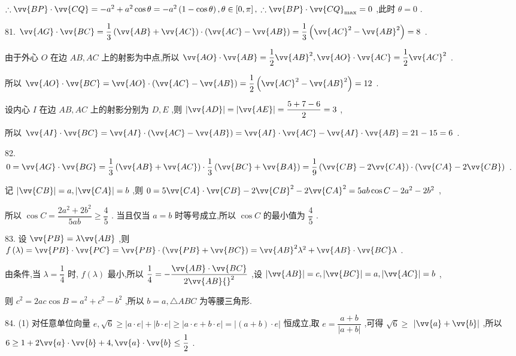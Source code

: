 $\therefore \vv{BP} \cdot  \vv{CQ} =  - {a}^{2} + {a}^{2}\cos \theta  =  - {a}^{2}\left( {1 - \cos \theta }\right) ,\theta  \in  \left\lbrack  {0,\pi }\right\rbrack  ,\;\therefore \vv{BP} \cdot  {\vv{CQ}}_{\max } = 0$ ,此时 $\theta  = 0$ .

81. $\vv{AG} \cdot  \vv{BC} = \dfrac{1}{3}\left( {\vv{AB} + \vv{AC}}\right)  \cdot  \left( {\vv{AC} - \vv{AB}}\right)  = \dfrac{1}{3}\left( {{\vv{AC}}^{2} - {\vv{AB}}^{2}}\right)  = 8$ .

由于外心 $O$ 在边 ${AB},{AC}$ 上的射影为中点,所以 $\vv{AO} \cdot  \vv{AB} = \dfrac{1}{2}{\vv{AB}}^{2},\vv{AO} \cdot  \vv{AC} = \dfrac{1}{2}{\vv{AC}}^{2}$ .

所以 $\vv{AO} \cdot  \vv{BC} = \vv{AO} \cdot  \left( {\vv{AC} - \vv{AB}}\right)  = \dfrac{1}{2}\left( {{\vv{AC}}^{2} - {\vv{AB}}^{2}}\right)  = {12}$ .

设内心 $I$ 在边 ${AB},{AC}$ 上的射影分别为 $D,E$ ,则 $\left| \vv{AD}\right|  = \left| \vv{AE}\right|  = \dfrac{5 + 7 - 6}{2} = 3$ ,

所以 $\vv{AI} \cdot  \vv{BC} = \vv{AI} \cdot  \left( {\vv{AC} - \vv{AB}}\right)  = \vv{AI} \cdot  \vv{AC} - \vv{AI} \cdot  \vv{AB} = {21} - {15} = 6$ .

82. $0 = \vv{AG} \cdot  \vv{BG} = \dfrac{1}{3}\left( {\vv{AB} + \vv{AC}}\right)  \cdot  \dfrac{1}{3}\left( {\vv{BC} + \vv{BA}}\right)  = \dfrac{1}{9}\left( {\vv{CB} - 2\vv{CA}}\right)  \cdot  \left( {\vv{CA} - 2\vv{CB}}\right)$ .

记 $\left| \vv{CB}\right|  = a,\left| \vv{CA}\right|  = b$ ,则 $0 = 5\vv{CA} \cdot  \vv{CB} - 2{\vv{CB}}^{2} - 2{\vv{CA}}^{2} = {5ab}\cos C - 2{a}^{2} - 2{b}^{2}$ ,

所以 $\cos C = \dfrac{2{a}^{2} + 2{b}^{2}}{5ab} \geq  \dfrac{4}{5}$ . 当且仅当 $a = b$ 时等号成立,所以 $\cos C$ 的最小值为 $\dfrac{4}{5}$ .

83. 设 $\vv{PB} = \lambda \vv{AB}$ ,则 $f\left( \lambda \right)  = \vv{PB} \cdot  \vv{PC} = \vv{PB} \cdot  \left( {\vv{PB} + \vv{BC}}\right)  = {\vv{AB}}^{2}{\lambda }^{2} + \vv{AB} \cdot  \vv{BC}\lambda$ .

由条件,当 $\lambda  = \dfrac{1}{4}$ 时, $f\left( \lambda \right)$ 最小,所以 $\dfrac{1}{4} =  - \dfrac{\vv{AB} \cdot  \vv{BC}}{2\vv{AB}{}^{2}}$ ,设 $\left| \vv{AB}\right|  = c,\left| \vv{BC}\right|  = a,\left| \vv{AC}\right|  = b$ ,

则 ${c}^{2} = {2ac}\cos B = {a}^{2} + {c}^{2} - {b}^{2}$ ,所以 $b = a,\bigtriangleup {ABC}$ 为等腰三角形.

84. (1) 对任意单位向量 $e,\sqrt{6} \geq  \left| {a \cdot  e}\right|  + \left| {b \cdot  e}\right|  \geq  \left| {a \cdot  e + b \cdot  e}\right|  = \left| {\left( {a + b}\right)  \cdot  e}\right|$ 恒成立,取 $e = \dfrac{a + b}{\left| a + b\right| }$ ,可得 $\sqrt{6} \geq$  $\left| {\vv{a} + \vv{b}}\right|$ ,所以 $6 \geq  1 + 2\vv{a} \cdot  \vv{b} + 4,\vv{a} \cdot  \vv{b} \leq  \dfrac{1}{2}$ .

